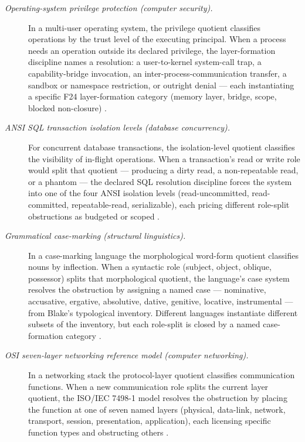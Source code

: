 \documentclass[11pt]{article}
\theoremstyle{definition}
\begin{document}
\begin{description}
\item[\emph{Operating-system privilege protection (computer
security).}]
In a multi-user operating system, the privilege quotient classifies
operations by the trust level of the executing principal.  When a
process needs an operation outside its declared privilege, the
layer-formation discipline names a resolution: a user-to-kernel
system-call trap, a capability-bridge invocation, an
inter-process-communication transfer, a sandbox or namespace
restriction, or
outright denial --- each instantiating a specific F24
layer-formation category (memory layer, bridge, scope, blocked
non-closure)
\citep{SaltzerSchroeder1975ProtectionInformation}.

\item[\emph{{ANSI} {SQL} transaction isolation levels (database
concurrency).}]
For concurrent database transactions, the isolation-level quotient
classifies the visibility of in-flight operations.  When a
transaction's read or write role would split that quotient ---
producing a dirty read, a non-repeatable read, or a phantom ---
the declared SQL resolution discipline forces the system into one
of the four ANSI isolation levels (read-uncommitted, read-committed,
repeatable-read, serializable), each pricing different role-split
obstructions as budgeted or scoped
\citep{BerensonBernsteinGrayMeltonONeilONeil1995SQLIsolation}.

\item[\emph{Grammatical case-marking (structural linguistics).}]
In a case-marking language the morphological word-form quotient
classifies nouns by inflection.  When a syntactic role (subject,
object, oblique, possessor) splits that morphological quotient, the
language's case system resolves the obstruction by assigning a
named case --- nominative, accusative, ergative, absolutive,
dative, genitive, locative, instrumental --- from Blake's
typological inventory.  Different languages instantiate different
subsets of the inventory, but each role-split is closed by a named
case-formation category
\citep{Blake2001Case}.

\item[\emph{{OSI} seven-layer networking reference model (computer
networking).}]
In a networking stack the protocol-layer quotient classifies
communication functions.  When a new communication role splits the
current layer quotient, the ISO/IEC 7498-1 model resolves the
obstruction by placing the function at one of seven named layers
(physical, data-link, network, transport, session, presentation,
application), each licensing specific function types and obstructing
others
\citep{ISOIEC7498OSI}.


\end{description}
\end{document}
